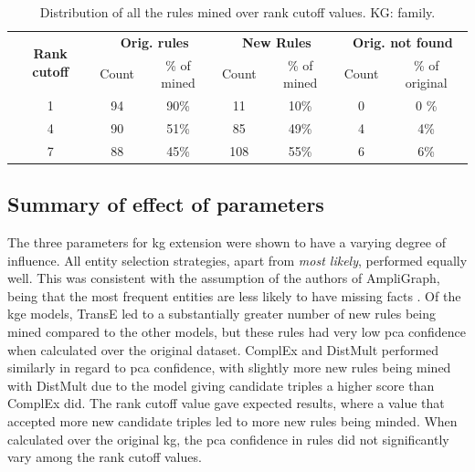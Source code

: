 \begin{table}[htp]
\centering
\begin{tabular}{ccccccc}
\multirow{2}{*}{\textbf{Rank cutoff}} & \multicolumn{2}{c}{\textbf{Orig. rules}} & \multicolumn{2}{c}{\textbf{New Rules}}   & \multicolumn{2}{c}{\textbf{Orig. not found}} \\
                                      & Count & \multicolumn{1}{c|}{\% of mined} & Count & \multicolumn{1}{c|}{\% of mined} & Count            & \% of original            \\ \hline
\multicolumn{1}{c|}{1}                & 94    & \multicolumn{1}{c|}{90\%}        & 11    & \multicolumn{1}{c|}{10\%}        & 0                & 0 \%                        \\
\multicolumn{1}{c|}{4}                & 90    & \multicolumn{1}{c|}{51\%}        & 85    & \multicolumn{1}{c|}{49\%}        & 4                & 4\%                       \\
\multicolumn{1}{c|}{7}                & 88    & \multicolumn{1}{c|}{45\%}        & 108   & \multicolumn{1}{c|}{55\%}        & 6                & 6\%                      
\end{tabular}
\caption[Dist. of rules over rank cutoff - family KG.]{Distribution of all the rules mined over rank cutoff values. KG: family.}
\label{Tab:table_rules_ranks_family}
\end{table}
    
\subsection{Summary of effect of parameters}
The three parameters for \gls{kg} extension were shown to have a varying degree of influence. All entity selection strategies, apart from \textit{most likely}, performed equally well. This was consistent with the assumption of the authors of AmpliGraph, being that the most frequent entities are less likely to have missing facts \cite{ampligraph}. Of the \gls{kge} models, TransE led to a substantially greater number of new rules being mined compared to the other models, but these rules had very low \gls{pca} confidence when calculated over the original dataset. ComplEx and DistMult performed similarly in regard to \gls{pca} confidence, with slightly more new rules being mined with DistMult due to the model giving candidate triples a higher score than ComplEx did. The rank cutoff value gave expected results, where a value that accepted more new candidate triples led to more new rules being minded. When calculated over the original \gls{kg}, the \gls{pca} confidence in rules did not significantly vary among the rank cutoff values. 

